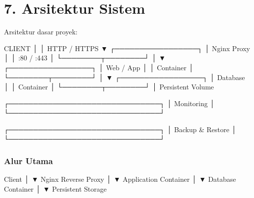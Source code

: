 \documentclass[
]{article}
\newenvironment{Shaded}{\begin{snugshade}}{\end{snugshade}}
\newcommand{\NormalTok}[1]{#1}
\begin{document}
\section{7. Arsitektur Sistem}\label{arsitektur-sistem}

Arsitektur dasar proyek:

\begin{Shaded}
\begin{Highlighting}[]
\NormalTok{                         CLIENT}
\NormalTok{                           │}
\NormalTok{                           │ HTTP / HTTPS}
\NormalTok{                           ▼}
\NormalTok{                  ┌─────────────────┐}
\NormalTok{                  │  Nginx Proxy    │}
\NormalTok{                  │    :80 / :443   │}
\NormalTok{                  └────────┬────────┘}
\NormalTok{                           │}
\NormalTok{                           ▼}
\NormalTok{                  ┌─────────────────┐}
\NormalTok{                  │   Web / App     │}
\NormalTok{                  │    Container    │}
\NormalTok{                  └────────┬────────┘}
\NormalTok{                           │}
\NormalTok{                           ▼}
\NormalTok{                  ┌─────────────────┐}
\NormalTok{                  │    Database     │}
\NormalTok{                  │    Container    │}
\NormalTok{                  └────────┬────────┘}
\NormalTok{                           │}
\NormalTok{                    Persistent Volume}


\NormalTok{        ┌───────────────────────────────┐}
\NormalTok{        │           Monitoring          │}
\NormalTok{        └───────────────────────────────┘}

\NormalTok{        ┌───────────────────────────────┐}
\NormalTok{        │        Backup \& Restore       │}
\NormalTok{        └───────────────────────────────┘}
\end{Highlighting}
\end{Shaded}

\subsubsection{Alur Utama}\label{alur-utama}

\begin{Shaded}
\begin{Highlighting}[]
\NormalTok{Client}
\NormalTok{   │}
\NormalTok{   ▼}
\NormalTok{Nginx Reverse Proxy}
\NormalTok{   │}
\NormalTok{   ▼}
\NormalTok{Application Container}
\NormalTok{   │}
\NormalTok{   ▼}
\NormalTok{Database Container}
\NormalTok{   │}
\NormalTok{   ▼}
\NormalTok{Persistent Storage}
\end{Highlighting}
\end{Shaded}
\end{document}
